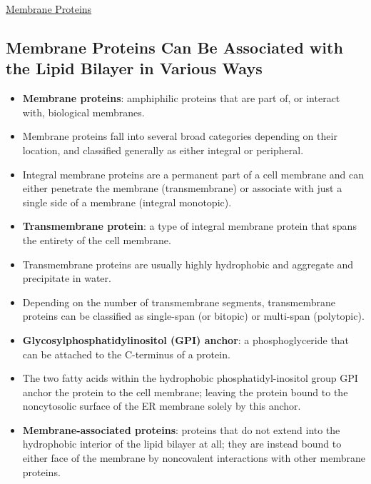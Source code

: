 \documentclass[12pt,letterpaper]{article}
\begin{document}
\hypertarget{10.2a}{}
\begin{secbox}{\hyperlink{10}{Membrane Proteins}}{
    \hypertarget{10.7}{\subsection*{Membrane Proteins Can Be Associated with the Lipid Bilayer in Various Ways}}
    \begin{itemize}
        \item \textbf{Membrane proteins}: amphiphilic proteins that are part of, or interact with, biological membranes. 
        \item Membrane proteins fall into several broad categories depending on their location, and classified generally as either integral or peripheral.
        \item Integral membrane proteins are a permanent part of a cell membrane and can either penetrate the membrane (transmembrane) or associate with just a single side of a membrane (integral monotopic).
        \item \textbf{Transmembrane protein}: a type of integral membrane protein that spans the entirety of the cell membrane.
        \item Transmembrane proteins are usually highly hydrophobic and aggregate and precipitate in water.
        \item Depending on the number of transmembrane segments, transmembrane proteins can be classified as single-span (or bitopic) or multi-span (polytopic).
        \item \textbf{Glycosylphosphatidylinositol (GPI) anchor}: a phosphoglyceride that can be attached to the C-terminus of a protein.
        \item The two fatty acids within the hydrophobic phosphatidyl-inositol group GPI anchor the protein to the cell membrane; leaving the protein bound to the noncytosolic surface of the ER membrane solely by this anchor.
        \item \textbf{Membrane-associated proteins}: proteins that do not extend into the hydrophobic interior of the lipid bilayer at all; they are instead bound to either face of the membrane by noncovalent interactions with other membrane proteins.\par

\end{itemize}}
\end{secbox}
\end{document}
